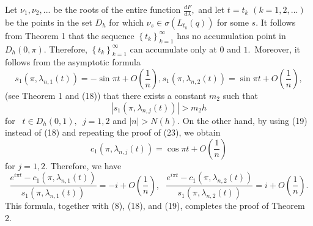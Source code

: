 \documentclass{article}%
\begin{document}
Let $\nu_{1},\nu_{2},...$ be the roots of the entire function $\frac
{dF}{d\lambda},$ and let $t=t_{k}$ $(k=1,2,...)$ be the points in the set
$D_{h}$ for which $\nu_{s}\in\sigma(L_{t_{k}}(q))$ for some $s.$ It follows
from Theorem 1 that the sequence $\left\{  t_{k}\right\}  _{k=1}^{\infty}$ has
no accumulation point in $D_{h}(0,\pi).$ Therefore, $\left\{  t_{k}\right\}
_{k=1}^{\infty}$ can accumulate only at $0$ and $1.$\ Moreover, it follows
from the asymptotic formula
\begin{equation}
s_{1}(\pi,\lambda_{n,1}(t))=-\sin\pi t+O\left(  \frac{1}{n}\right)  ,\text{
}s_{1}(\pi,\lambda_{n,2}(t))=\sin\pi t+O\left(  \frac{1}{n}\right)  , \tag{23}%
\end{equation}
(see Theorem 1 and (18)) that there exists a constant $m_{2}$ such that
\begin{equation}
\left\vert s_{1}(\pi,\lambda_{n,j}(t))\right\vert >m_{2}h \tag{24}%
\end{equation}
for\textit{ \ }$t\in D_{h}(0,1),$\textit{\ }$j=1,2$ and $\mid n\mid>N(h).$ On
the other hand, by using (19) instead of (18) and repeating the proof of (23),
we obtain
\begin{equation}
c_{1}(\pi,\lambda_{n,j}(t))=\cos\pi t+O\left(  \frac{1}{n}\right)  \tag{25}%
\end{equation}
for $j=1,2.$ Therefore, we have
\[
\frac{e^{i\pi t}-c_{1}(\pi,\lambda_{n,1}(t))}{s_{1}(\pi,\lambda_{n,1}%
(t))}=-i+O\left(  \frac{1}{n}\right)  ,\text{ }\frac{e^{i\pi t}-c_{1}%
(\pi,\lambda_{n,2}(t))}{s_{1}(\pi,\lambda_{n,2}(t))}=i+O\left(  \frac{1}%
{n}\right)  .
\]
This formula, together with (8), (18), and (19), completes the proof of
Theorem 2.
\end{document}
